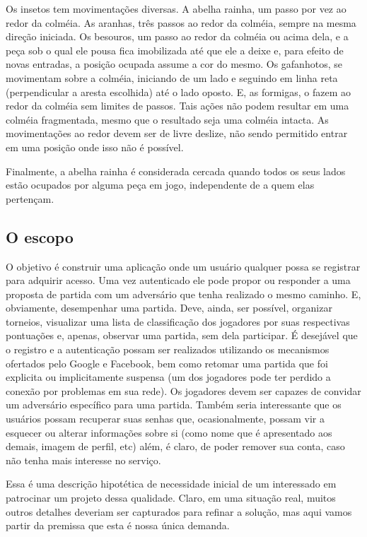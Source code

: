     Os insetos tem movimentações diversas. A abelha rainha, um passo por vez ao redor da colméia. As aranhas, três passos ao redor da colméia, sempre na mesma direção iniciada. Os besouros, um passo ao redor da colméia ou acima dela, e a peça sob o qual ele pousa fica imobilizada até que ele a deixe e, para efeito de novas entradas, a posição ocupada assume a cor do mesmo. Os gafanhotos, se movimentam sobre a colméia, iniciando de um lado e seguindo em linha reta (perpendicular a aresta escolhida) até o lado oposto. E,  as formigas, o fazem ao redor da colméia sem limites de passos. Tais ações não podem resultar em uma colméia fragmentada, mesmo que o resultado seja uma colméia intacta. As movimentações ao redor devem ser de livre deslize, não sendo permitido entrar em uma posição onde isso não é possível.

    Finalmente, a abelha rainha é considerada cercada quando todos os seus lados estão ocupados por alguma peça em jogo, independente de a quem elas pertençam.

  \subsection{O escopo}

    O objetivo é construir uma aplicação onde um usuário qualquer possa se registrar para adquirir acesso. Uma vez autenticado ele pode propor ou responder a uma proposta de partida com um adversário que tenha realizado o mesmo caminho. E, obviamente, desempenhar uma partida. Deve, ainda, ser possível, organizar torneios, visualizar uma lista de classificação dos jogadores por suas respectivas pontuações e, apenas, observar uma partida, sem dela participar. É desejável que o registro e a autenticação possam ser realizados utilizando os mecanismos ofertados pelo Google e Facebook, bem como retomar uma partida que foi explicita ou implicitamente suspensa (um dos jogadores pode ter perdido a conexão por problemas em sua rede). Os jogadores devem ser capazes de convidar um adversário específico para uma partida. Também seria interessante que os usuários possam recuperar suas senhas que, ocasionalmente, possam vir a esquecer ou alterar informações sobre si (como nome que é apresentado aos demais, imagem de perfil, etc) além, é claro, de poder remover sua conta, caso não tenha mais interesse no serviço.

    Essa é uma descrição hipotética de necessidade inicial de um interessado em patrocinar um projeto dessa qualidade. Claro, em uma situação real, muitos outros detalhes deveriam ser capturados para refinar a solução, mas aqui vamos partir da premissa que esta é nossa única demanda.

  
